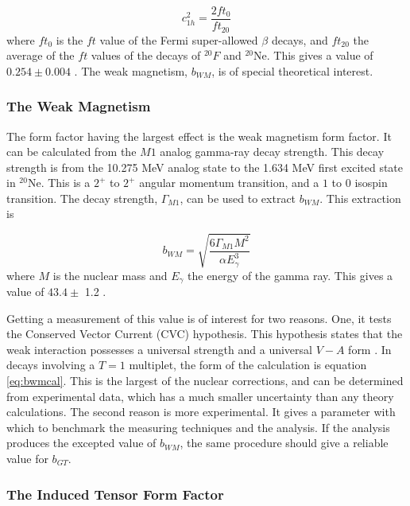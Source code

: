 \documentclass[../MaxHughesThesis.tex]{subfiles}
\begin{document}
\begin{equation}
	c_{1h}^{2} = \frac{2 ft_{0}}{ft_{20}}
	\label{eq:c1eq}
\end{equation}
where $ft_{0}$ is the $ft$ value of the Fermi super-allowed $\beta$ decays, and $ft_{20}$ the average of the $ft$ values of the decays of $^{20}F$ and $^{20}$Ne.
This gives a value of $0.254 \pm 0.004$ \cite{Min11}.
The weak magnetism, $b_{WM}$, is of special theoretical interest. 

\subsubsection{The Weak Magnetism}
The form factor having the largest effect is the weak magnetism form factor. 
It can be calculated from the $M1$ analog gamma-ray decay strength.
This decay strength is from the 10.275 MeV analog state to the 1.634 MeV first excited state in $^{20}$Ne.
This is a $2^{+}$ to $2^{+}$ angular momentum transition, and a $1$ to $0$ isospin transition.
The decay strength, $\Gamma_{M1}$, can be used to extract $b_{WM}$.
This extraction is 

\begin{equation}
	b_{WM} = \sqrt{\frac{6\Gamma_{M1}M^{2}}{\alpha E_{\gamma}^{3}}}
	\label{eq:bwmcal}
\end{equation}
where $M$ is the nuclear mass and $E_{\gamma}$ the energy of the gamma ray.
This gives a value of $43.4 \pm$ 1.2 \cite{Min11}.

Getting a measurement of this value is of interest for two reasons.
One, it tests the Conserved Vector Current (CVC) hypothesis.
This hypothesis states that the weak interaction possesses a universal strength and a universal $V-A$ form \cite{Man58}.
In decays involving a $T = 1$ multiplet, the form of the calculation is equation \ref{eq:bwmcal}. 
This is the largest of the nuclear corrections, and can be determined from experimental data, which has a much smaller uncertainty than any theory calculations.
The second reason is more experimental.
It gives a parameter with which to benchmark the measuring techniques and the analysis.
If the analysis produces the excepted value of $b_{WM}$, the same procedure should give a reliable value for $b_{GT}$.

\subsubsection{The Induced Tensor Form Factor}
\end{document}
